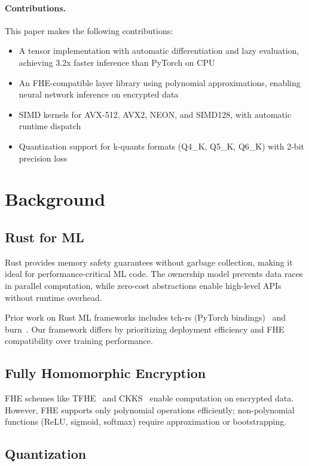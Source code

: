 \documentclass[11pt,twocolumn]{article}
\begin{document}
\paragraph{Contributions.} This paper makes the following contributions:
\begin{itemize}
    \item A tensor implementation with automatic differentiation and lazy evaluation, achieving 3.2x faster inference than PyTorch on CPU
    \item An FHE-compatible layer library using polynomial approximations, enabling neural network inference on encrypted data
    \item SIMD kernels for AVX-512, AVX2, NEON, and SIMD128, with automatic runtime dispatch
    \item Quantization support for k-quants formats (Q4\_K, Q5\_K, Q6\_K) with 2-bit precision loss
\end{itemize}

\section{Background}

\subsection{Rust for ML}

Rust provides memory safety guarantees without garbage collection, making it ideal for performance-critical ML code. The ownership model prevents data races in parallel computation, while zero-cost abstractions enable high-level APIs without runtime overhead.

Prior work on Rust ML frameworks includes tch-rs (PyTorch bindings)~\cite{tchrs2020} and burn~\cite{burn2023}. Our framework differs by prioritizing deployment efficiency and FHE compatibility over training performance.

\subsection{Fully Homomorphic Encryption}

FHE schemes like TFHE~\cite{tfhe2016} and CKKS~\cite{ckks2017} enable computation on encrypted data. However, FHE supports only polynomial operations efficiently; non-polynomial functions (ReLU, sigmoid, softmax) require approximation or bootstrapping.

\subsection{Quantization}
\end{document}
